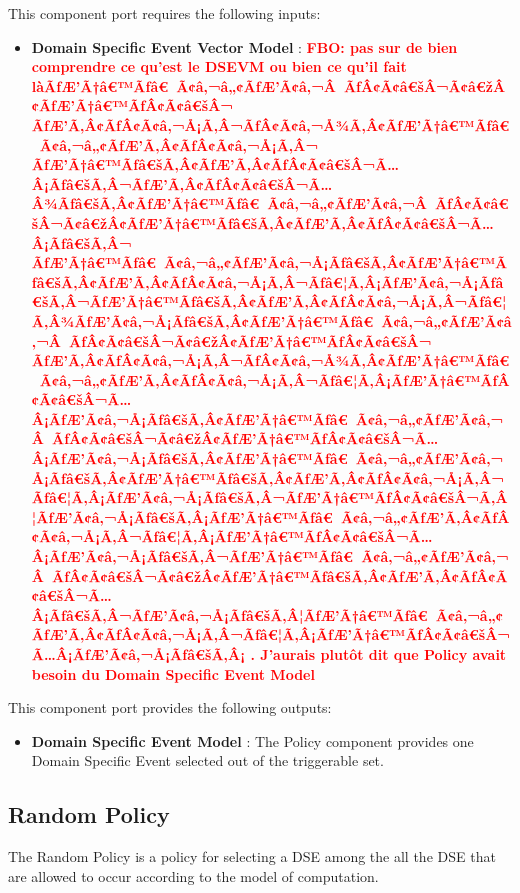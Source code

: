 \documentclass{gemoc} %
\begin{document}
This component port requires the following inputs:
\begin{itemize}
  \item \textbf{Domain Specific Event Vector Model} :
\textbf{\textcolor{red}{FBO: pas sur de bien comprendre ce qu'est le DSEVM ou bien ce qu'il fait l\`aÃƒÆ’Ã†â€™Ãƒâ€ Ã¢â‚¬â„¢ÃƒÆ’Ã¢â‚¬Â ÃƒÂ¢Ã¢â€šÂ¬Ã¢â€žÂ¢ÃƒÆ’Ã†â€™ÃƒÂ¢Ã¢â€šÂ¬ ÃƒÆ’Ã‚Â¢ÃƒÂ¢Ã¢â‚¬Å¡Ã‚Â¬ÃƒÂ¢Ã¢â‚¬Å¾Ã‚Â¢ÃƒÆ’Ã†â€™Ãƒâ€ Ã¢â‚¬â„¢ÃƒÆ’Ã‚Â¢ÃƒÂ¢Ã¢â‚¬Å¡Ã‚Â¬ ÃƒÆ’Ã†â€™Ãƒâ€šÃ‚Â¢ÃƒÆ’Ã‚Â¢ÃƒÂ¢Ã¢â€šÂ¬Ã…Â¡Ãƒâ€šÃ‚Â¬ÃƒÆ’Ã‚Â¢ÃƒÂ¢Ã¢â€šÂ¬Ã…Â¾Ãƒâ€šÃ‚Â¢ÃƒÆ’Ã†â€™Ãƒâ€ Ã¢â‚¬â„¢ÃƒÆ’Ã¢â‚¬Â ÃƒÂ¢Ã¢â€šÂ¬Ã¢â€žÂ¢ÃƒÆ’Ã†â€™Ãƒâ€šÃ‚Â¢ÃƒÆ’Ã‚Â¢ÃƒÂ¢Ã¢â€šÂ¬Ã…Â¡Ãƒâ€šÃ‚Â¬ ÃƒÆ’Ã†â€™Ãƒâ€ Ã¢â‚¬â„¢ÃƒÆ’Ã¢â‚¬Å¡Ãƒâ€šÃ‚Â¢ÃƒÆ’Ã†â€™Ãƒâ€šÃ‚Â¢ÃƒÆ’Ã‚Â¢ÃƒÂ¢Ã¢â‚¬Å¡Ã‚Â¬Ãƒâ€¦Ã‚Â¡ÃƒÆ’Ã¢â‚¬Å¡Ãƒâ€šÃ‚Â¬ÃƒÆ’Ã†â€™Ãƒâ€šÃ‚Â¢ÃƒÆ’Ã‚Â¢ÃƒÂ¢Ã¢â‚¬Å¡Ã‚Â¬Ãƒâ€¦Ã‚Â¾ÃƒÆ’Ã¢â‚¬Å¡Ãƒâ€šÃ‚Â¢ÃƒÆ’Ã†â€™Ãƒâ€ Ã¢â‚¬â„¢ÃƒÆ’Ã¢â‚¬Â ÃƒÂ¢Ã¢â€šÂ¬Ã¢â€žÂ¢ÃƒÆ’Ã†â€™ÃƒÂ¢Ã¢â€šÂ¬ ÃƒÆ’Ã‚Â¢ÃƒÂ¢Ã¢â‚¬Å¡Ã‚Â¬ÃƒÂ¢Ã¢â‚¬Å¾Ã‚Â¢ÃƒÆ’Ã†â€™Ãƒâ€ Ã¢â‚¬â„¢ÃƒÆ’Ã‚Â¢ÃƒÂ¢Ã¢â‚¬Å¡Ã‚Â¬Ãƒâ€¦Ã‚Â¡ÃƒÆ’Ã†â€™ÃƒÂ¢Ã¢â€šÂ¬Ã…Â¡ÃƒÆ’Ã¢â‚¬Å¡Ãƒâ€šÃ‚Â¢ÃƒÆ’Ã†â€™Ãƒâ€ Ã¢â‚¬â„¢ÃƒÆ’Ã¢â‚¬Â ÃƒÂ¢Ã¢â€šÂ¬Ã¢â€žÂ¢ÃƒÆ’Ã†â€™ÃƒÂ¢Ã¢â€šÂ¬Ã…Â¡ÃƒÆ’Ã¢â‚¬Å¡Ãƒâ€šÃ‚Â¢ÃƒÆ’Ã†â€™Ãƒâ€ Ã¢â‚¬â„¢ÃƒÆ’Ã¢â‚¬Å¡Ãƒâ€šÃ‚Â¢ÃƒÆ’Ã†â€™Ãƒâ€šÃ‚Â¢ÃƒÆ’Ã‚Â¢ÃƒÂ¢Ã¢â‚¬Å¡Ã‚Â¬Ãƒâ€¦Ã‚Â¡ÃƒÆ’Ã¢â‚¬Å¡Ãƒâ€šÃ‚Â¬ÃƒÆ’Ã†â€™ÃƒÂ¢Ã¢â€šÂ¬Ã‚Â¦ÃƒÆ’Ã¢â‚¬Å¡Ãƒâ€šÃ‚Â¡ÃƒÆ’Ã†â€™Ãƒâ€ Ã¢â‚¬â„¢ÃƒÆ’Ã‚Â¢ÃƒÂ¢Ã¢â‚¬Å¡Ã‚Â¬Ãƒâ€¦Ã‚Â¡ÃƒÆ’Ã†â€™ÃƒÂ¢Ã¢â€šÂ¬Ã…Â¡ÃƒÆ’Ã¢â‚¬Å¡Ãƒâ€šÃ‚Â¬ÃƒÆ’Ã†â€™Ãƒâ€ Ã¢â‚¬â„¢ÃƒÆ’Ã¢â‚¬Â ÃƒÂ¢Ã¢â€šÂ¬Ã¢â€žÂ¢ÃƒÆ’Ã†â€™Ãƒâ€šÃ‚Â¢ÃƒÆ’Ã‚Â¢ÃƒÂ¢Ã¢â€šÂ¬Ã…Â¡Ãƒâ€šÃ‚Â¬ÃƒÆ’Ã¢â‚¬Å¡Ãƒâ€šÃ‚Â¦ÃƒÆ’Ã†â€™Ãƒâ€ Ã¢â‚¬â„¢ÃƒÆ’Ã‚Â¢ÃƒÂ¢Ã¢â‚¬Å¡Ã‚Â¬Ãƒâ€¦Ã‚Â¡ÃƒÆ’Ã†â€™ÃƒÂ¢Ã¢â€šÂ¬Ã…Â¡ÃƒÆ’Ã¢â‚¬Å¡Ãƒâ€šÃ‚Â¡  . J'aurais plut\^ot dit que Policy avait besoin du Domain Specific Event Model}}
\end{itemize}

This component port provides the following outputs:
\begin{itemize}
  \item \textbf{Domain Specific Event Model} :
The Policy component provides one Domain Specific Event selected out of the triggerable set.
\end{itemize}


\subsection{Random Policy}
The Random Policy is a policy for selecting a DSE among the all the DSE that are allowed to occur according to the model of computation.
\end{document}
